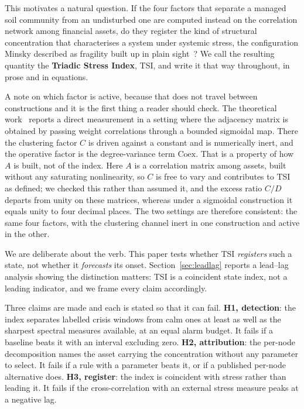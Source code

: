 \documentclass[11pt,a4paper]{article}
\begin{document}
This motivates a natural question. If the four factors that separate a
managed soil community from an undisturbed one are computed instead on the
correlation network among financial assets, do they register the kind of
structural concentration that characterises a system under systemic stress,
the configuration Minsky described as fragility built up in plain
sight~\cite{minsky1992}? We call the resulting quantity the \textbf{Triadic
Stress Index}, TSI, and write it that way throughout, in prose and in
equations.

A note on which factor is active, because that does not travel between
constructions and it is the first thing a reader should check. The
theoretical work~\cite{acedo2026fsri} reports a direct measurement in a
setting where the adjacency matrix is obtained by passing weight correlations
through a bounded sigmoidal map. There the clustering factor $C$ is driven
against a constant and is numerically inert, and the operative factor is the
degree-variance term $\mathrm{Coex}$. That is a property of how $A$ is built,
not of the index. Here $A$ is a correlation matrix among assets, built without
any saturating nonlinearity, so $C$ is free to vary and contributes to
TSI as defined; we checked this rather than assumed it, and the excess
ratio $C/D$ departs from unity on these matrices, whereas under a sigmoidal
construction it equals unity to four decimal places. The two settings are
therefore consistent: the same four factors, with the clustering channel inert
in one construction and active in the other.

We are deliberate about the verb. This paper tests whether TSI
\emph{registers} such a state, not whether it \emph{forecasts} its onset.
Section~\ref{sec:leadlag} reports a lead--lag analysis showing the distinction
matters: TSI is a coincident state index, not a leading indicator, and we
frame every claim accordingly.

Three claims are made and each is stated so that it can fail.
\textbf{H1, detection}: the index separates labelled crisis windows from calm
ones at least as well as the sharpest spectral measures available, at an equal
alarm budget. It fails if a baseline beats it with an interval excluding zero.
\textbf{H2, attribution}: the per-node decomposition names the asset carrying
the concentration without any parameter to select. It fails if a rule with a
parameter beats it, or if a published per-node alternative does.
\textbf{H3, register}: the index is coincident with stress rather than leading
it. It fails if the cross-correlation with an external stress measure peaks at
a negative lag.
\end{document}
